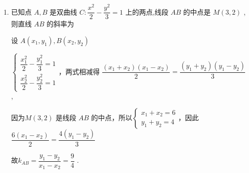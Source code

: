 \begin{enumerate}
\begin{enumerate}
\begin{jieda}
            则 $\dfrac{6}{{a}^{2}} - \dfrac{2}{{b}^{2}} = 0$ ,即 ${a}^{2} = 3{b}^{2}$ ,则 $a = \sqrt{3}b$ ,则 $\dfrac{a}{b} = \sqrt{3}$，故双曲线的渐近线方程为 $y =  \pm  \sqrt{3}x$.
        \end{jieda}


        \item 已知点 $A,B$ 是双曲线 $C : \dfrac{{x}^{2}}{2} - \dfrac{{y}^{2}}{3} = 1$ 上的两点,线段 ${AB}$ 的中点是 $M\left( {3,2}\right)$ ,则直线 ${AB}$ 的斜率为
        \begin{jieda}
            设 $A\left( {{x}_{1},{y}_{1}}\right) ,B\left( {{x}_{2},{y}_{2}}\right)$ 
            
            $\left \{\begin{array}{l}
                 \dfrac{{x}_{1}^{2}}{2} - \dfrac{{y}_{1}^{2}}{3} = 1  \\
                 \dfrac{{x}_{2}^{2}}{2} - \dfrac{{y}_{2}^{2}}{3} = 1
            \end{array} \right.$，两式相减得 $\dfrac{\left( {{x}_{1} + {x}_{2}}\right) \left( {{x}_{1} - {x}_{2}}\right) }{2} = \dfrac{\left( {{y}_{1} + {y}_{2}}\right) \left( {{y}_{1} - {y}_{2}}\right) }{3}$ ,

            因为$M\left( {3,2}\right)$ 是线段 ${AB}$ 的中点，所以$\left \{\begin{array}{l}
                 {x}_{1} + {x}_{2} = 6  \\
                 {y}_{1} + {y}_{2} = 4
            \end{array} \right.$，因此$\dfrac{6\left( {{x}_{1} - {x}_{2}}\right) }{2} = \dfrac{4\left( {{y}_{1} - {y}_{2}}\right) }{3}$
            
            故${k}_{AB} = \dfrac{{y}_{1} - {y}_{2}}{{x}_{1} - {x}_{2}} = \dfrac{9}{4}$ .
        \end{jieda}


\end{enumerate}
\end{enumerate}
